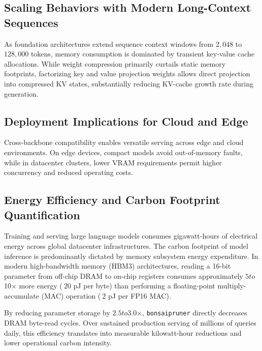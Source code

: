 \subsection{Scaling Behaviors with Modern Long-Context Sequences}
As foundation architectures extend sequence context windows from $2{,}048$ to $128{,}000$ tokens, memory consumption is dominated by transient key-value cache allocations. While weight compression primarily curtails static memory footprints, factorizing key and value projection weights allows direct projection into compressed KV states, substantially reducing KV-cache growth rate during generation.

\subsection{Deployment Implications for Cloud and Edge}
Cross-backbone compatibility enables versatile serving across edge and cloud environments. On edge devices, compact models avoid out-of-memory faults, while in datacenter clusters, lower VRAM requirements permit higher concurrency and reduced operating costs.

\subsection{Energy Efficiency and Carbon Footprint Quantification}
Training and serving large language models consumes gigawatt-hours of electrical energy across global datacenter infrastructures. The carbon footprint of model inference is predominantly dictated by memory subsystem energy expenditure. In modern high-bandwidth memory (HBM3) architectures, reading a 16-bit parameter from off-chip DRAM to on-chip registers consumes approximately $5$\times$ to $10$\times$ more energy ($~20$ pJ per byte) than performing a floating-point multiply-accumulate (MAC) operation ($~2$ pJ per FP16 MAC).

By reducing parameter storage by $2.5$\times$ to $3.0$\times$, \texttt{bonsaipruner} directly decreases DRAM byte-read cycles. Over sustained production serving of millions of queries daily, this efficiency translates into measurable kilowatt-hour reductions and lower operational carbon intensity.
